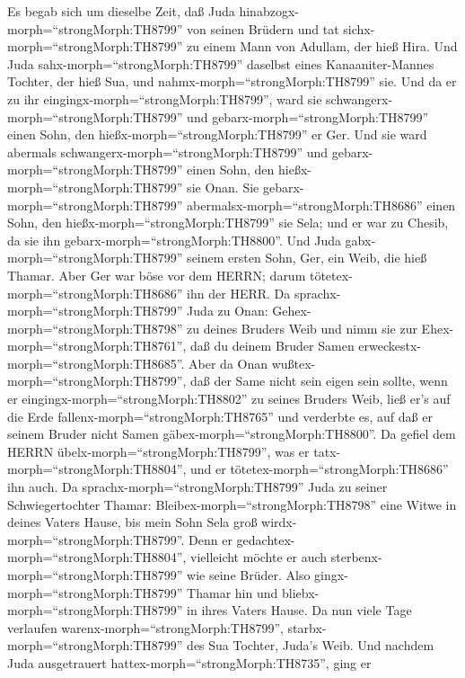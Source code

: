  Es begab sich um dieselbe Zeit, daß Juda
hinabzogx-morph=``strongMorph:TH8799'' von seinen Brüdern und tat
sichx-morph=``strongMorph:TH8799'' zu einem Mann von Adullam, der hieß
Hira.  Und Juda sahx-morph=``strongMorph:TH8799'' daselbst
eines Kanaaniter-Mannes Tochter, der hieß Sua, und
nahmx-morph=``strongMorph:TH8799'' sie. Und da er zu ihr
eingingx-morph=``strongMorph:TH8799'',  ward sie
schwangerx-morph=``strongMorph:TH8799'' und
gebarx-morph=``strongMorph:TH8799'' einen Sohn, den
hießx-morph=``strongMorph:TH8799'' er Ger.  Und sie ward
abermals schwangerx-morph=``strongMorph:TH8799'' und
gebarx-morph=``strongMorph:TH8799'' einen Sohn, den
hießx-morph=``strongMorph:TH8799'' sie Onan.  Sie
gebarx-morph=``strongMorph:TH8799''
abermalsx-morph=``strongMorph:TH8686'' einen Sohn, den
hießx-morph=``strongMorph:TH8799'' sie Sela; und er war zu Chesib, da
sie ihn gebarx-morph=``strongMorph:TH8800''.  Und Juda
gabx-morph=``strongMorph:TH8799'' seinem ersten Sohn, Ger, ein Weib, die
hieß Thamar.  Aber Ger war böse vor dem HERRN; darum
tötetex-morph=``strongMorph:TH8686'' ihn der HERR.  Da
sprachx-morph=``strongMorph:TH8799'' Juda zu Onan:
Gehex-morph=``strongMorph:TH8798'' zu deines Bruders Weib und nimm sie
zur Ehex-morph=``strongMorph:TH8761'', daß du deinem Bruder Samen
erweckestx-morph=``strongMorph:TH8685''.  Aber da Onan
wußtex-morph=``strongMorph:TH8799'', daß der Same nicht sein eigen sein
sollte, wenn er eingingx-morph=``strongMorph:TH8802'' zu seines Bruders
Weib, ließ er's auf die Erde fallenx-morph=``strongMorph:TH8765'' und
verderbte es, auf daß er seinem Bruder nicht Samen
gäbex-morph=``strongMorph:TH8800''.  Da gefiel dem HERRN
übelx-morph=``strongMorph:TH8799'', was er
tatx-morph=``strongMorph:TH8804'', und er
tötetex-morph=``strongMorph:TH8686'' ihn auch.  Da
sprachx-morph=``strongMorph:TH8799'' Juda zu seiner Schwiegertochter
Thamar: Bleibex-morph=``strongMorph:TH8798'' eine Witwe in deines Vaters
Hause, bis mein Sohn Sela groß wirdx-morph=``strongMorph:TH8799''. Denn
er gedachtex-morph=``strongMorph:TH8804'', vielleicht möchte er auch
sterbenx-morph=``strongMorph:TH8799'' wie seine Brüder. Also
gingx-morph=``strongMorph:TH8799'' Thamar hin und
bliebx-morph=``strongMorph:TH8799'' in ihres Vaters Hause. 
Da nun viele Tage verlaufen warenx-morph=``strongMorph:TH8799'',
starbx-morph=``strongMorph:TH8799'' des Sua Tochter, Juda's Weib. Und
nachdem Juda ausgetrauert hattex-morph=``strongMorph:TH8735'', ging er
